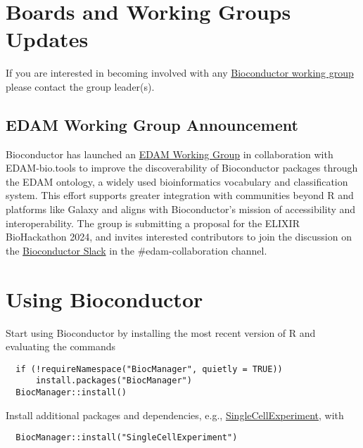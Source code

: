 \section{Boards and Working Groups Updates}\label{boards-and-working-groups-updates}

If you are interested in becoming involved with any \href{https://workinggroups.bioconductor.org/currently-active-working-groups-committees.html}{Bioconductor working group} please contact the group leader(s).

\subsection{EDAM Working Group Announcement}\label{edam-working-group-announcement}

Bioconductor has launched an \href{https://workinggroups.bioconductor.org/currently-active-working-groups-committees.html\#edam-collaboration}{EDAM Working Group} in collaboration with EDAM-bio.tools to improve the discoverability of Bioconductor packages through the EDAM ontology, a widely used bioinformatics vocabulary and classification system. This effort supports greater integration with communities beyond R and platforms like Galaxy and aligns with Bioconductor's mission of accessibility and interoperability. The group is submitting a proposal for the ELIXIR BioHackathon 2024, and invites interested contributors to join the discussion on the \href{https://slack.bioconductor.org}{Bioconductor Slack} in the \#edam-collaboration channel.

\section{Using Bioconductor}\label{using-bioconductor}

Start using
Bioconductor by installing the most recent version of R and evaluating
the commands

\begin{verbatim}
  if (!requireNamespace("BiocManager", quietly = TRUE))
      install.packages("BiocManager")
  BiocManager::install()
\end{verbatim}

Install additional packages and dependencies,
e.g., \href{https://bioconductor.org/packages/SingleCellExperiment}{SingleCellExperiment}, with

\begin{verbatim}
  BiocManager::install("SingleCellExperiment")
\end{verbatim}

